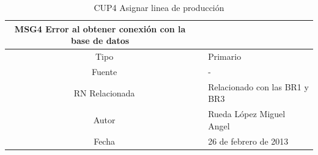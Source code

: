 \documentclass[10pt,spanish]{article}
\providecommand{\tabularnewline}{\\}
\begin{document}
\begin{table}[!ht]
\begin{centering}
\begin{tabular}{|c||c|l|}
{		MSG4 Error al obtener conexión con la base de datos}\tabularnewline		
		\hline 
		\multicolumn{2}{|c|}{Tipo} & Primario\tabularnewline
		\hline 
		\multicolumn{2}{|c|}{Fuente} & \multicolumn{1}{p{12cm}|}{-}\tabularnewline
		\hline 
		\multicolumn{2}{|c|}{RN Relacionada} & \multicolumn{1}{p{12cm}|}{Relacionado con las BR1 y BR3}\tabularnewline
		\hline 		
		\multicolumn{2}{|c|}{Autor} & Rueda López Miguel Angel\tabularnewline
		\hline 
		\multicolumn{2}{|c|}{Fecha} & 26 de febrero de 2013\tabularnewline
		\hline 				
		\end{tabular}
		\par\end{centering}
		
	\caption{CUP4 Asignar linea de producción}
	\label{tab:CasosdeUso:nombredecasodeuso} 
	\end{table}
	
\end{document}
